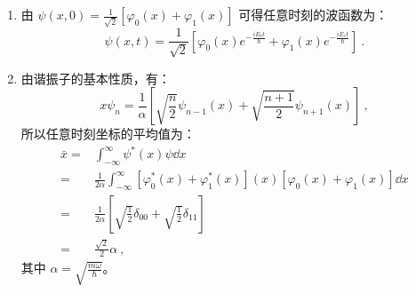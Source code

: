 \subsection{ }
\begin{enumerate}
\item 由 $\displaystyle \psi (x,0) = \frac{1}{\sqrt{2}}[\varphi_{0}(x) + \varphi_{1}(x)] $ 可得任意时刻的波函数为：\\
\begin{equation}
\psi(x,t) = \frac{1}{\sqrt{2}}\left[\varphi_{0}(x)e^{-\frac{iE_{0}t}{\hbar}} + \varphi_{1}(x)e^{-\frac{iE_{1}t}{\hbar}} \right]~.
\end{equation}

\item 由谐振子的基本性质，有：\\
\begin{equation}
x\psi_{n} = \frac{1}{\alpha} \left[\sqrt{\frac{n}{2}}\psi_{n-1}(x) + \sqrt{\frac{n+1}{2}}\psi_{n+1}(x) \right]~,
\end{equation}
所以任意时刻坐标的平均值为：\\
\begin{equation}
\begin{aligned}
\bar{x} =& \int^{\infty}_{-\infty} \psi^{*}(x)\psi \dd{x} \\
=& \frac{1}{2\alpha} \int^{\infty}_{-\infty} \left[\varphi^{*}_{0}(x)+\varphi^{*}_{1}(x)\right](x)\left[\varphi_{0}(x)+\varphi_{1}(x)\right] \dd{x} \\
=& \frac{1}{2\alpha} \left[\sqrt{\frac{1}{2}}\delta_{00}+\sqrt{\frac{1}{2}}\delta_{11} \right] \\
=& \frac{\sqrt{2}}{2} \alpha~,
\end{aligned}
\end{equation}
其中 $\displaystyle \alpha = \sqrt{\frac{m\omega}{\hbar}} $。
\end{enumerate}
